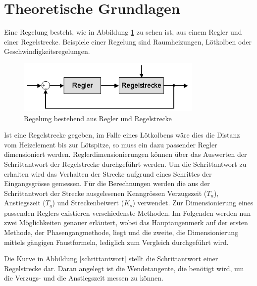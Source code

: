 \section{Theoretische Grundlagen}
Eine Regelung besteht, wie in Abbildung \ref{regelstrecke} zu sehen ist, aus einem Regler und einer Regelstrecke. Beispiele einer Regelung sind Raumheizungen, Lötkolben oder Geschwindigkeitsregelungen.\newline 

\begin{figure}[h]
\centering
\includegraphics[width=0.8\textwidth]{Regelstrecke.png}
\caption{Regelung bestehend aus Regler und Regelstrecke \cite{rnwissen}}
\label{regelstrecke}
\end{figure}


Ist eine Regelstrecke gegeben, im Falle eines Lötkolbens wäre dies die Distanz vom Heizelement bis zur Lötspitze, so muss ein dazu passender Regler dimensioniert werden. Reglerdimensionierungen können über das Auswerten der Schrittantwort der Regelstrecke durchgeführt werden. Um die Schrittantwort zu erhalten wird das Verhalten der Strecke aufgrund eines Schrittes der Eingangsgrösse gemessen. Für die Berechnungen werden die aus der Schrittantwort der Strecke ausgelesenen Kenngrössen Verzugszeit ($T_u$), Anstiegszeit ($T_g$) und Streckenbeiwert ($K_s$) verwendet. Zur Dimensionierung eines passenden Reglers existieren verschiedenste Methoden. Im Folgenden werden nun zwei Möglichkeiten genauer erläutert, wobei das Hauptaugenmerk auf der ersten Methode, der Phasengangmethode, liegt und die zweite, die Dimensionierung mittels gängigen Faustformeln, lediglich zum Vergleich durchgeführt wird.\newline

\newpage
Die Kurve in Abbildung \ref{schrittantwort} stellt die Schrittantwort einer Regelstrecke dar. Daran angelegt ist die Wendetangente, die benötigt wird, um die Verzugs- und die Anstiegszeit messen zu können.\newline

